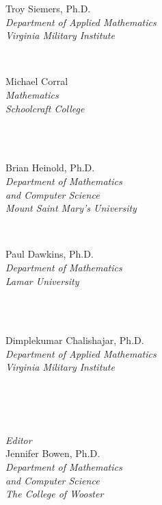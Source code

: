 

\noindent\hspace{-1in}\begin{minipage}{\linewidth}
\parbox[b]{.5\linewidth}{%
Troy Siemers, Ph.D.\\\small
\emph{Department of Applied Mathematics}\\
\emph{Virginia Military Institute}}~
\parbox[b]{.4\linewidth}{Michael Corral\\\small
\emph{Mathematics}\\
\emph{Schoolcraft College}}\iflatexml\\\fi\bigskip\\
\parbox[t]{.5\linewidth}{Brian Heinold, Ph.D.\\\small
\emph{Department of Mathematics}\\
\emph{and Computer Science}\\
\emph{Mount Saint Mary's University}}~
\parbox[t]{.4\linewidth}{Paul Dawkins, Ph.D.\\\small
\emph{Department of Mathematics}\\
\emph{Lamar University}}\iflatexml\\\fi\bigskip\\
\parbox{.5\linewidth}{%
Dimplekumar Chalishajar, Ph.D.\\\small
\emph{Department of Applied Mathematics}\\
\emph{Virginia Military Institute}}\iflatexml\\\\\fi\bigskip\medskip\\
\parbox{.5\linewidth}{%
\textit{Editor}\\
Jennifer Bowen, Ph.D.\\\small
\emph{Department of Mathematics}\\
\emph{and Computer Science}\\
\emph{The College of Wooster}}
\end{minipage}

